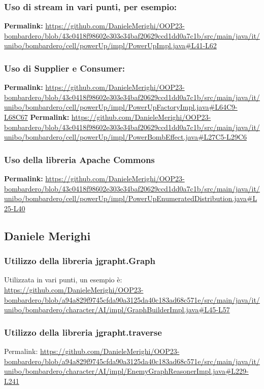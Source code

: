 \documentclass[a4paper,12pt]{report}
\begin{document}
\subsubsection{Uso di stream in vari punti, per esempio:}
\textbf{Permalink:} \url{https://github.com/DanieleMerighi/OOP23-bombardero/blob/43c0418f98602e303e34baf20629ccd1dd0a7c1b/src/main/java/it/unibo/bombardero/cell/powerUp/impl/PowerUpImpl.java#L41-L62}

\subsubsection{Uso di Supplier e Consumer:}
\textbf{Permalink:} \url{https://github.com/DanieleMerighi/OOP23-bombardero/blob/43c0418f98602e303e34baf20629ccd1dd0a7c1b/src/main/java/it/unibo/bombardero/cell/powerUp/impl/PowerUpFactoryImpl.java#L64C9-L68C67}
\textbf{Permalink:} \url{https://github.com/DanieleMerighi/OOP23-bombardero/blob/43c0418f98602e303e34baf20629ccd1dd0a7c1b/src/main/java/it/unibo/bombardero/cell/powerUp/impl/PowerBombEffect.java#L27C5-L29C6}

\subsubsection{Uso della libreria Apache Commons}
\textbf{Permalink:} \url{https://github.com/DanieleMerighi/OOP23-bombardero/blob/43c0418f98602e303e34baf20629ccd1dd0a7c1b/src/main/java/it/unibo/bombardero/cell/powerUp/impl/PowerUpEnumeratedDistribution.java#L25-L40}




\subsection{Daniele Merighi}
\par
\subsubsection{Utilizzo della libreria jgrapht.Graph}
Utilizzata in vari punti, un esempio è:
\url{https://github.com/DanieleMerighi/OOP23-bombardero/blob/a94a829f9745cfda90a3125da40c183ad68c571e/src/main/java/it/unibo/bombardero/character/AI/impl/GraphBuilderImpl.java#L45-L57}

\par
\subsubsection{Utilizzo della libreria jgrapht.traverse}
Permalink: \url{https://github.com/DanieleMerighi/OOP23-bombardero/blob/a94a829f9745cfda90a3125da40c183ad68c571e/src/main/java/it/unibo/bombardero/character/AI/impl/EnemyGraphReasonerImpl.java#L229-L241}
\end{document}
